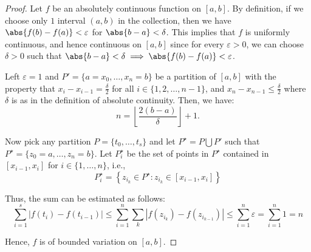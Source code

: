 \documentclass{article}
\begin{document}
\begin{proof}
    Let $f$ be an absolutely continuous function on $\left[a, b\right]$. By definition, if we choose only $1$ interval $(a, b)$ in the collection, then we have $\abs{f(b) - f(a)} < \varepsilon$ for $\abs{b - a} < \delta$. This implies that $f$ is uniformly continuous, and hence continuous on $\left[a, b\right]$ since for every $\varepsilon > 0$, we can choose $\delta > 0$ such that $\abs{b - a} < \delta \implies \abs{f(b) - f(a)} < \varepsilon$.

    Left \(\varepsilon = 1\) and \( P' = \{a = x_0, \ldots, x_n = b\} \) be a partition of \([a,b]\) with the property that \( x_i - x_{i-1} = \frac{\delta}{2} \) for all \( i \in \{1, 2, \ldots, n-1\} \), and \( x_n - x_{n-1} \leq \frac{\delta}{2} \) where $\delta$ is as in the definition of absolute continuity. Then, we have:
    \[
    n = \left\lfloor \dfrac{2(b - a)}{\delta} \right\rfloor + 1.
    \]

    Now pick any partition \( P = \{t_0,\ldots,t_s\} \) and let \( P^{\star} = P \bigcup P' \) such that \( P^{\star} = \{z_0 = a, \ldots, z_n = b\} \). Let \( P^{\star}_i \) be the set of points in \( P^{\star} \) contained in \([x_{i-1}, x_i]\) for \( i \in \{1,\ldots,n\} \), i.e.,
    \[
    P^{\star}_i = \left\{ z_{i_k} \in P^{\star} : z_{i_k} \in [x_{i-1}, x_i] \right\}
    \]

    Thus, the sum can be estimated as follows:
    \[
    \sum_{i=1}^s |f(t_i) - f(t_{i-1})| \leq \sum_{i=1}^{n} \sum_{k} |f(z_{i_k}) - f(z_{i_{k-1}})| \leq \sum_{i = 1}^{n} \varepsilon = \sum_{i = 1}^{n} 1 = n
    \]

    Hence, \( f \) is of bounded variation on \([a,b]\).
\end{proof}
\end{document}
